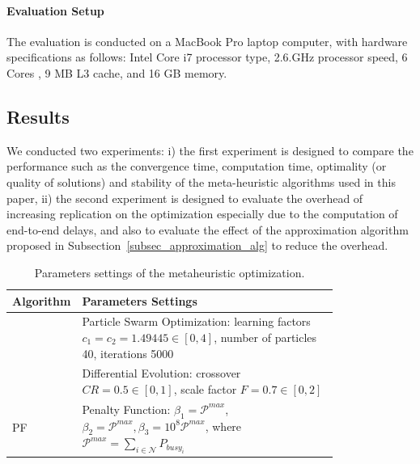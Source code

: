 \paragraph{Evaluation Setup} The evaluation is conducted on a MacBook Pro laptop computer, with hardware specifications as follows: Intel Core i7 processor type, 2.6.GHz processor speed, 6 Cores , 9 MB L3 cache, and 16 GB memory.

\subsection{Results}
We conducted two experiments: i) the first experiment is designed to compare the performance such as the convergence time, computation time, optimality (or quality of solutions) and stability of the meta-heuristic algorithms used in this paper, ii) the second experiment is designed to evaluate the overhead of increasing replication on the optimization especially due to the computation of end-to-end delays, and also to evaluate the effect of the approximation algorithm proposed in Subsection~\ref{subsec_approximation_alg} to reduce the overhead.
\begin{table}
	\centering\small
	\begin{tabular}{@{}lp{0.8\linewidth}@{}}
		\toprule
		Algorithm & Parameters Settings\\ 
		\midrule
		\pso	& Particle Swarm Optimization: learning factors $c_1=c_2=1.49445\in [0,4]$,  number of particles 40, iterations 5000	\\
		\de	& Differential Evolution: crossover $CR=0.5\in[0,1]$, scale factor $F=0.7\in[0,2]$  \\
		PF& Penalty Function:  $\beta_1=\mathcal{P}^{max}$,  $\beta_2=\mathcal{P}^{max}, \beta_3=10^8\mathcal{P}^{max}$, where  $\mathcal{P}^{max}=\sum_{i\in \mathcal{N}}{P_{busy_i}}$\\
		\bottomrule
	\end{tabular}
	\caption{Parameters settings of the metaheuristic optimization.}
	\label{tbl_para}
\end{table}

